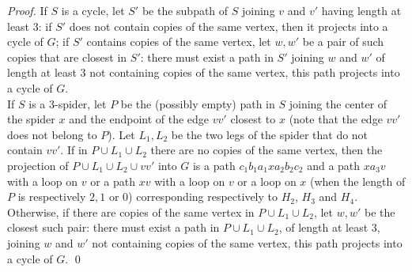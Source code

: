 \documentclass[runningheads]{llncs}
\newcommand{\wal}[1]{\textcolor{red}{#1}}
\newcommand{\ale}[1]{\textcolor{blue}{#1}}
\begin{document}
\begin{proof}
If $S$ is a cycle, let $S'$ be the subpath of $S$ joining $v$ and $v'$ having length at least 3: if $S'$ does not contain copies of the same vertex, then it projects into a cycle of $G$; if $S'$ contains copies of the same vertex, let $w,w'$ be a pair of such copies that are closest in 
{$S'$}: there must exist a path in 
{$S'$}
joining $w$ and $w'$ of length at least 3 not containing copies of the same vertex, this path projects into a cycle of $G$.\\
If $S$ is a $3$-spider, let $P$ be the (possibly empty) path in $S$ joining {the center of the spider $x$ and the endpoint of the edge $vv'$ closest to $x$ (note that the edge $vv'$ does not belong to $P$)}. {Let $L_1,L_2$ be the two legs of the spider that do not contain $vv'$}. {If in $P\cup L_1\cup L_2$} there are no copies of the same vertex, then the projection of {$P\cup L_1\cup L_2\cup vv'$ into $G$ is} a path $c_1b_1a_1xa_2b_2c_2$ and a path $xa_3v$ with a loop on $v$ or a path $xv$ with a loop on $v$ or a loop on $x$ (when the length of $P$ is respectively $2,1$ or 0) corresponding respectively to $H_2$, $H_3$ and $H_4$. 
{Otherwise, if there are copies of the same vertex in $P\cup L_1\cup L_2$, let $w,w'$ be the closest such pair}: there must exist a path in {$P\cup L_1\cup L_2$}, of length at least $3$, joining $w$ and $w'$ not containing copies of the same vertex, this path projects into a cycle of $G$. 
\qed\end{proof}
\end{document}
